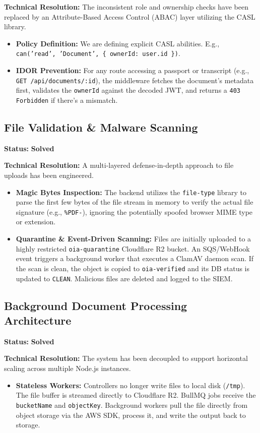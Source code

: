 \documentclass[12pt, a4paper]{article}
\begin{document}
\textbf{Technical Resolution:}
The inconsistent role and ownership checks have been replaced by an Attribute-Based Access Control (ABAC) layer utilizing the CASL library.
\begin{itemize}
    \item \textbf{Policy Definition:} We are defining explicit CASL abilities. E.g., \texttt{can('read', 'Document', \{ ownerId: user.id \})}.
    \item \textbf{IDOR Prevention:} For any route accessing a passport or transcript (e.g., \texttt{GET /api/documents/:id}), the middleware fetches the document's metadata first, validates the \texttt{ownerId} against the decoded JWT, and returns a \texttt{403 Forbidden} if there's a mismatch.
\end{itemize}

\subsection{File Validation \& Malware Scanning}
\textbf{Status:} \textcolor{solved}{\textbf{Solved}}

\textbf{Technical Resolution:}
A multi-layered defense-in-depth approach to file uploads has been engineered.
\begin{itemize}
    \item \textbf{Magic Bytes Inspection:} The backend utilizes the \texttt{file-type} library to parse the first few bytes of the file stream in memory to verify the actual file signature (e.g., \texttt{\%PDF-}), ignoring the potentially spoofed browser MIME type or extension.
    \item \textbf{Quarantine \& Event-Driven Scanning:} Files are initially uploaded to a highly restricted \texttt{oia-quarantine} Cloudflare R2 bucket. An SQS/WebHook event triggers a background worker that executes a ClamAV daemon scan. If the scan is clean, the object is copied to \texttt{oia-verified} and its DB status is updated to \texttt{CLEAN}. Malicious files are deleted and logged to the SIEM.
\end{itemize}

\subsection{Background Document Processing Architecture}
\textbf{Status:} \textcolor{solved}{\textbf{Solved}}

\textbf{Technical Resolution:}
The system has been decoupled to support horizontal scaling across multiple Node.js instances.
\begin{itemize}
    \item \textbf{Stateless Workers:} Controllers no longer write files to local disk (\texttt{/tmp}). The file buffer is streamed directly to Cloudflare R2. BullMQ jobs receive the \texttt{bucketName} and \texttt{objectKey}. Background workers pull the file directly from object storage via the AWS SDK, process it, and write the output back to storage.
\end{itemize}
\end{document}
